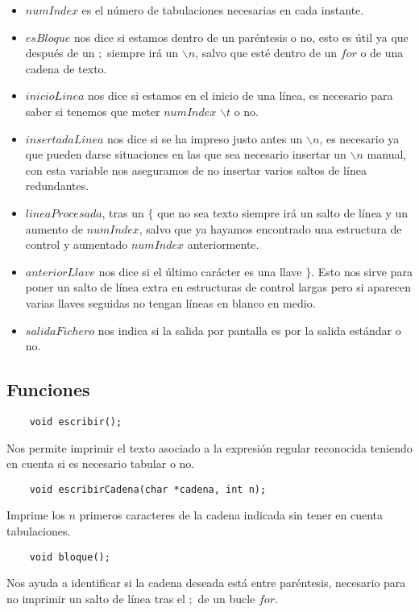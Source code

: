 \documentclass[11pt,spanish]{article} %
\begin{document}
\begin{itemize}
	\item $numIndex$ es el número de tabulaciones necesarias en cada instante.
	\item $esBloque$ nos dice si estamos dentro de un paréntesis o no, esto es útil ya que después de un $;$ siempre irá un $  \backslash n$, salvo que esté dentro de un $for$ o de una cadena de texto.
	\item $inicioLinea$ nos dice si estamos en el inicio de una línea, es necesario para saber si tenemos que meter $numIndex$ $\backslash t$ o no.
	\item $insertadaLinea$ nos dice si se ha impreso justo antes un $\backslash n$, es necesario ya que pueden darse situaciones en las que sea necesario insertar un $\backslash n$ manual, con esta variable nos aseguramos de no insertar varios saltos de línea redundantes.
	\item $lineaProcesada$, tras un $\{$ que no sea texto siempre irá un salto de línea y un aumento de $numIndex$, salvo que ya hayamos encontrado una estructura de control y aumentado $numIndex$ anteriormente.
	\item $anteriorLlave$ nos dice si el último carácter es una llave $\}$. Esto nos sirve para poner un salto de línea extra en estructuras de control largas pero si aparecen varias llaves seguidas no tengan líneas en blanco en medio.
	\item $salidaFichero$ nos indica si la salida por pantalla es por la salida estándar o no.
\end{itemize}

\subsection{Funciones}
\begin{lstlisting}
	void escribir();
\end{lstlisting}
Nos permite imprimir el texto asociado a la expresión regular reconocida teniendo en cuenta si es necesario tabular o no.


\vspace{0.5cm}
\begin{lstlisting}
	void escribirCadena(char *cadena, int n);
\end{lstlisting}
Imprime los $n$ primeros caracteres de la cadena indicada sin tener en cuenta tabulaciones.

\vspace{0.5cm}
\begin{lstlisting}
	void bloque();
\end{lstlisting}
Nos ayuda a identificar si la cadena deseada está entre paréntesis, necesario para no imprimir un salto de línea tras el $;$ de un bucle $for$.
\end{document}
